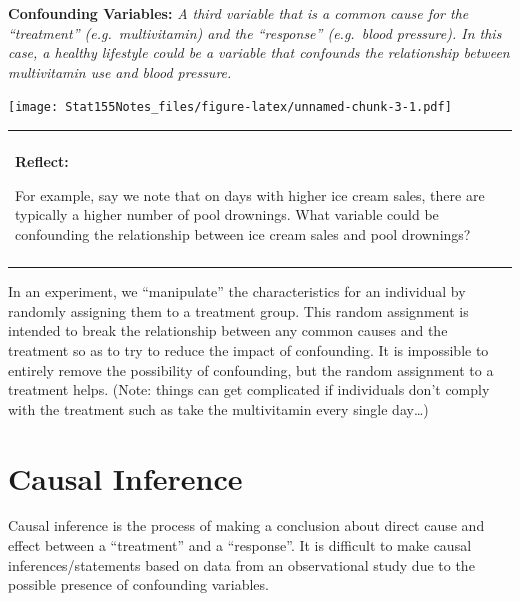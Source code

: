 \documentclass[]{book}
\newenvironment{Shaded}{\begin{snugshade}}{\end{snugshade}}
\newcommand{\CharTok}[1]{\textcolor[rgb]{0.31,0.60,0.02}{#1}}
\newcommand{\DataTypeTok}[1]{\textcolor[rgb]{0.13,0.29,0.53}{#1}}
\newcommand{\KeywordTok}[1]{\textcolor[rgb]{0.13,0.29,0.53}{\textbf{#1}}}
\newcommand{\NormalTok}[1]{#1}
\newcommand{\OperatorTok}[1]{\textcolor[rgb]{0.81,0.36,0.00}{\textbf{#1}}}
\newcommand{\OtherTok}[1]{\textcolor[rgb]{0.56,0.35,0.01}{#1}}
\newcommand{\StringTok}[1]{\textcolor[rgb]{0.31,0.60,0.02}{#1}}
\newenvironment{reflect}
{
    \begin{center}
    
    \begin{tabular}{|p{0.8\textwidth}|}
    \rowcolor{LightBlue}
    \hline\\
    \rowcolor{LightBlue}
    \textbf{Reflect:}
}
{
    \\\rowcolor{LightBlue}
    \\\hline
    \end{tabular} 
    \end{center}
}
\begin{document}
\textbf{Confounding Variables:} \emph{A third variable that is a common cause for the ``treatment'' (e.g.~multivitamin) and the ``response'' (e.g.~blood pressure). In this case, a healthy lifestyle could be a variable that confounds the relationship between multivitamin use and blood pressure.}

\begin{Shaded}
\end{Shaded}

\texttt{[image: Stat155Notes\_files/figure-latex/unnamed-chunk-3-1.pdf]}

\begin{reflect}
For example, say we note that on days with higher ice cream sales, there
are typically a higher number of pool drownings. What variable could be
confounding the relationship between ice cream sales and pool drownings?
\end{reflect}

In an experiment, we ``manipulate'' the characteristics for an individual by randomly assigning them to a treatment group. This random assignment is intended to break the relationship between any common causes and the treatment so as to try to reduce the impact of confounding. It is impossible to entirely remove the possibility of confounding, but the random assignment to a treatment helps. (Note: things can get complicated if individuals don't comply with the treatment such as take the multivitamin every single day\ldots{})

\hypertarget{dag}{%
\section{Causal Inference}\label{dag}}

Causal inference is the process of making a conclusion about direct cause and effect between a ``treatment'' and a ``response''. It is difficult to make causal inferences/statements based on data from an observational study due to the possible presence of confounding variables.
\end{document}
